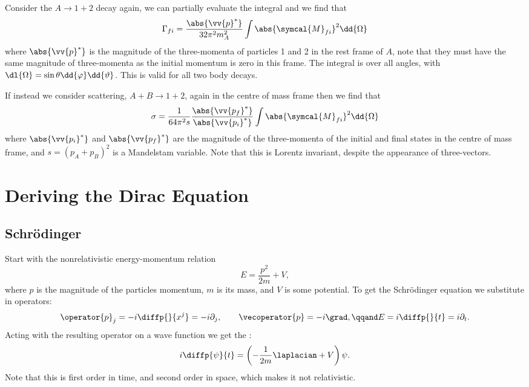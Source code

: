 \documentclass[fleqn]{NotesClass}
\newcommand{\amplitude}{\symcal{M}}
\begin{document}
    Consider the \(A \to 1 + 2\) decay again, we can partially evaluate the integral and we find that
    \begin{equation}
        \Gamma_{fi} = \frac{\abs{\vv{p}^*}}{32\pi^2 m_A^2} \int \abs{\amplitude_{fi}}^2 \dd{\Omega}
    \end{equation}
    where \(\abs{\vv{p}^*}\) is the magnitude of the three-momenta of particles 1 and 2 in the rest frame of \(A\), note that they must have the same magnitude of three-momenta as the initial momentum is zero in this frame.
    The integral is over all angles, with \(\dl{\Omega} = \sin\theta \dd{\varphi} \dd{\vartheta}\).
    This is valid for all two body decays.
    
    If instead we consider scattering, \(A + B \to 1 + 2\), again in the centre of mass frame then we find that
    \begin{equation}
        \sigma = \frac{1}{64\pi^2s} \frac{\abs{\vv{p_f}^*}}{\abs{\vv{p_i}^*}} \int \abs{\amplitude_{fi}}^2 \dd{\Omega}
    \end{equation}
    where \(\abs{\vv{p_i}^*}\) and \(\abs{\vv{p_f}^*}\) are the magnitude of the three-momenta of the initial and final states in the centre of mass frame, and \(s = (p_A + p_B)^2\) is a Mandelstam variable.
    Note that this is Lorentz invariant, despite the appearance of three-vectors.
    
    \chapter{Deriving the Dirac Equation}
    \section{Schrödinger}
    Start with the nonrelativistic energy-momentum relation
    \begin{equation}
        E = \frac{p^2}{2m} + V,
    \end{equation}
    where \(p\) is the magnitude of the particles momentum, \(m\) is its mass, and \(V\) is some potential.
    To get the Schrödinger equation we substitute in operators:
    \begin{equation}
        \operator{p}_j = -i\diffp{}{x^j} = -i\partial_j, \qquad \vecoperator{p} = -i\grad, \qqand E = i\diffp{}{t} = i\partial_t.
    \end{equation}
    Acting with the resulting operator on a wave function we get the :
    \begin{equation}
        i\diffp{\psi}{t} = \left( -\frac{1}{2m} \laplacian + V \right)\psi.
    \end{equation}
    Note that this is first order in time, and second order in space, which makes it not relativistic.
    
\end{document}
